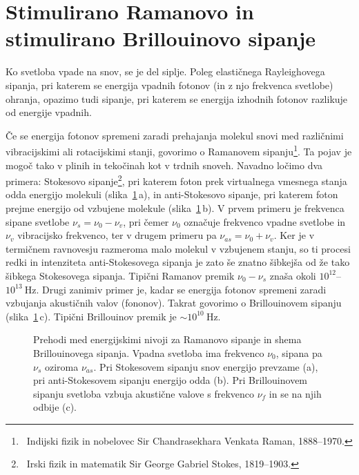 \section{Stimulirano Ramanovo in stimulirano Brillouinovo sipanje}
\label{chap:SRS}
Ko svetloba vpade na snov, se je del siplje. Poleg elastičnega Rayleighovega sipanja,
pri katerem se energija vpadnih fotonov (in z njo frekvenca svetlobe) ohranja, opazimo 
tudi sipanje, pri katerem se energija izhodnih fotonov razlikuje od energije 
vpadnih. 

Če se energija fotonov spremeni zaradi prehajanja molekul snovi med različnimi
vibracijskimi ali rotacijskimi stanji, govorimo o Ramanovem
sipanju\footnote{~Indijski fizik in nobelovec Sir Chandrasekhara Venkata Raman, 1888--1970.}. 
Ta pojav je mogoč tako v plinih in tekočinah kot v trdnih snoveh. Navadno 
ločimo dva primera: Stokesovo sipanje\footnote{~Irski fizik in matematik Sir George Gabriel
Stokes, 1819--1903.}, pri katerem foton prek virtualnega vmesnega stanja 
odda energijo molekuli (slika~\ref{08_Raman}\,a),
in anti-Stokesovo sipanje,
pri katerem foton prejme energijo od vzbujene molekule (slika~\ref{08_Raman}\,b).
V prvem primeru je frekvenca
sipane svetlobe $\nu_s=\nu_0-\nu_v$, pri čemer $\nu_0$ označuje frekvenco vpadne
svetlobe in $\nu_v$ vibracijsko frekvenco, ter v drugem primeru pa $\nu_{as}=\nu_0+\nu_v$.
Ker je v termičnem ravnovesju razmeroma malo molekul v vzbujenem stanju, so ti 
procesi redki in intenziteta anti-Stokesovega sipanja je zato 
še znatno šibkejša od že tako šibkega Stokesovega sipanja. Tipični Ramanov premik 
$\nu_0-\nu_s$ znaša okoli $10^{12}$--$10^{13}~\si{\hertz}$.
Drugi zanimiv primer je, kadar se energija fotonov spremeni zaradi 
vzbujanja akustičnih valov (fononov). Takrat govorimo o Brillouinovem 
sipanju (slika~\ref{08_Raman}\,c).
Tipični Brillouinov premik je $\sim 10^{10}~\si{\hertz}$. 

\begin{figure}[ht]
\centering
\def\svgwidth{140truemm} 

\caption{Prehodi med energijskimi nivoji za Ramanovo sipanje in shema Brillouinovega sipanja. Vpadna 
svetloba ima frekvenco $\nu_0$, sipana pa $\nu_s$ oziroma $\nu_{as}$. Pri Stokesovem sipanju 
snov energijo prevzame (a), pri anti-Stokesovem sipanju energijo odda (b).
Pri Brillouinovem sipanju svetloba vzbuja akustične valove s frekvenco $\nu_f$ in se na njih odbije (c).}
\label{08_Raman}
\end{figure}

